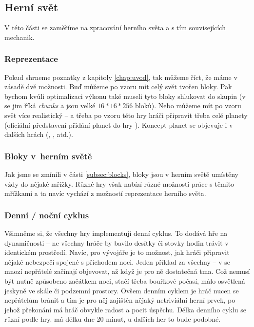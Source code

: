 \subsection{Herní svět}

V této části se zaměříme na zpracování herního světa a s tím souvisejících mechanik.

\subsubsection{Reprezentace}

Pokud shrneme poznatky z kapitoly \ref{chap:uvod}, tak můžeme říct, že máme v zásadě dvě možnosti. Buď můžeme po vzoru \MC{} mít celý svět tvořen bloky. Pak bychom kvůli optimalizaci výkonu také museli tyto bloky shlukovat do skupin (v  se jim říká \textit{chunks} a jsou velké $16*16*256$ bloků). Nebo můžeme mít po vzoru \SE{} svět více realistický -- a třeba po vzoru této hry hráči připravit třeba celé planety (oficiální představení přidání planet do hry \citep{se_planets}). Koncept planet se objevuje i v dalších hrách (\ME{}, \NMS{}, atd.).

\subsubsection{Bloky v~herním světě}

Jak jsme se zmínili v části \ref{subsec:blocks}, bloky jsou v herním světě umístěny vždy do nějaké mřížky. Různé hry však nabízí různé možnosti práce s těmito mřížkami a ta navíc vychází z možností reprezentace herního světa.


\subsubsection{Denní / noční cyklus}

Všimněme si, že všechny hry implementují denní cyklus. To dodává hře na dynamičnosti -- ne všechny hráče by bavilo desítky či stovky hodin trávit v identickém prostředí. Navíc, pro vývojáře je to možnost, jak hráči připravit nějaké nebezpečí spojené s příchodem noci. Jeden příklad za všechny -- v  se mnozí nepřátelé začínají objevovat, až když je pro ně dostatečná tma. Což nemusí být nutně způsobeno začátkem noci, stačí třeba bouřkové počasí, málo osvětlená jeskyně ve skále či podzemní prostory. Ovšem denním cyklem je hráč nucen se nepřátelům bránit a tím je pro něj zajištěn nějaký netriviální herní prvek, po jehož překonání má hráč obvykle radost a pocit úspěchu.
Délka denního cyklu se různí podle hry. \MC{} má délku dne 20 minut, u dalších her to bude podobné.


